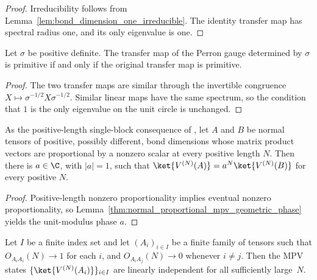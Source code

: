\begin{proof}\leanok
    Irreducibility follows from Lemma~\ref{lem:bond_dimension_one_irreducible}. The identity transfer map
    has spectral radius one, and its only eigenvalue is one.
\end{proof}

\begin{lemma}
    \label{lem:perron_gauge_primitive_iff}
    \leanok
    Let $\sigma$ be positive definite. The transfer map of the Perron gauge
    determined by $\sigma$ is primitive if and only if the original transfer
    map is primitive.
\end{lemma}

\begin{proof}\leanok
    The two transfer maps are similar through the invertible congruence
    $X\mapsto\sigma^{-1/2}X\sigma^{-1/2}$. Similar linear maps have the same
    spectrum, so the condition that $1$ is the only eigenvalue on the unit
    circle is unchanged.
\end{proof}

\begin{lemma}
    \label{cor:normal_positive_proportional_mpv_geometric_phase}
    \leanok
    As the positive-length single-block consequence of
    \cite[Corollary~A.3 and Theorem~2.10]{Cirac2016MPDO_arXiv}, let $A$ and $B$
    be normal tensors of positive, possibly different, bond dimensions whose
    matrix product vectors are proportional by a nonzero scalar at every
    positive length $N$. Then there is $a\in\C$, with $|a|=1$, such that
    $\ket{V^{(N)}(A)}=a^N\ket{V^{(N)}(B)}$ for every positive $N$.
\end{lemma}

\begin{proof}\leanok
    Positive-length nonzero proportionality implies eventual nonzero
    proportionality, so
    Lemma~\ref{thm:normal_proportional_mpv_geometric_phase} yields the
    unit-modulus phase $a$.
\end{proof}

\begin{lemma}
    \label{lem:bnt_finite_index_overlap_orthonormal_li}
    \leanok
    Let $I$ be a finite index set and let $(A_i)_{i \in I}$ be a finite
    family of tensors such that $O_{A_iA_i}(N) \to 1$ for each $i$, and
    $O_{A_iA_j}(N) \to 0$ whenever $i \neq j$. Then the MPV states
    $\{\ket{V^{(N)}(A_i)}\}_{i \in I}$ are linearly independent for all
    sufficiently large~$N$.
\end{lemma}

